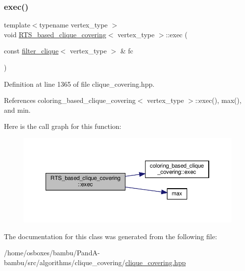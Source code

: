 \subsubsection{\texorpdfstring{exec()}{exec()}}
{\footnotesize\ttfamily template$<$typename vertex\+\_\+type $>$ \\
void \hyperlink{classRTS__based__clique__covering}{R\+T\+S\+\_\+based\+\_\+clique\+\_\+covering}$<$ vertex\+\_\+type $>$\+::exec (\begin{DoxyParamCaption}\item[{const \hyperlink{structfilter__clique}{filter\+\_\+clique}$<$ vertex\+\_\+type $>$ \&}]{fc }\end{DoxyParamCaption})\hspace{0.3cm}{\ttfamily [inline]}}



Definition at line 1365 of file clique\+\_\+covering.\+hpp.



References coloring\+\_\+based\+\_\+clique\+\_\+covering$<$ vertex\+\_\+type $>$\+::exec(), max(), and min.

Here is the call graph for this function\+:
\nopagebreak
\begin{figure}[H]
\begin{center}
\leavevmode
\includegraphics[width=350pt]{d7/d03/classRTS__based__clique__covering_a8420447a440f2eb93a4c2f2eb42fac14_cgraph}
\end{center}
\end{figure}


The documentation for this class was generated from the following file\+:\begin{DoxyCompactItemize}
\item 
/home/osboxes/bambu/\+Pand\+A-\/bambu/src/algorithms/clique\+\_\+covering/\hyperlink{clique__covering_8hpp}{clique\+\_\+covering.\+hpp}\end{DoxyCompactItemize}

